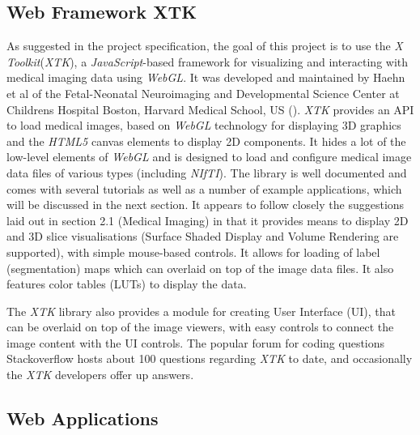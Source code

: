 \documentclass[a4paper,11pt,titlepage]{article}
\begin{document}
\subsection{Web Framework XTK}

As suggested in the project specification, the goal of this project is to use the \textit{X Toolkit}(\textit{XTK}), a \textit{JavaScript}-based framework for visualizing and interacting with medical imaging data using \textit{WebGL}. It was developed and maintained by Haehn et al of the Fetal-Neonatal Neuroimaging and Developmental Science Center at Childrens Hospital Boston, Harvard Medical School, US (\cite{xtk}). \textit{XTK} provides an API to load medical images, based on \textit{WebGL} technology for displaying 3D graphics and the \textit{HTML5} canvas elements to display 2D components. It hides a lot of the low-level elements of \textit{WebGL} and is designed to load and configure medical image data files of various types (including \textit{NIfTI}). The library is well documented and comes with several tutorials as well as a number of example applications, which will be discussed in the next section. It appears to follow closely the suggestions laid out in section 2.1 (Medical Imaging) in that it provides means to display 2D and 3D slice visualisations (Surface Shaded Display and Volume Rendering are supported), with simple mouse-based controls. It allows for loading of label (segmentation) maps which can overlaid on top of the image data files. It also features color tables (LUTs) to display the data.

The \textit{XTK} library also provides a module for creating User Interface (UI), that can be overlaid on top of the image viewers, with easy controls to connect the image content with the UI controls.
The popular forum for coding questions Stackoverflow hosts about 100 questions regarding \textit{XTK} to date, and occasionally the \textit{XTK} developers offer up answers.


\subsection{Web Applications}
\end{document}
